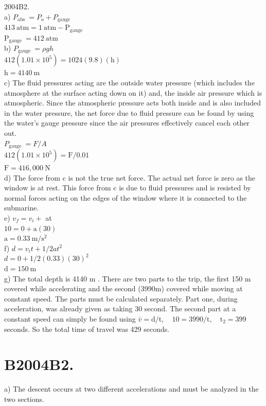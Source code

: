 \begin{enumerate}
2004B2.\\
a) $P_{\text {abs }}=P_{o}+P_{\text {gauge }}$\\
$413 \mathrm{~atm}=1 \mathrm{~atm}-\mathrm{P}_{\text {gauge }}$\\
$\mathrm{P}_{\text {gauge }}=412 \mathrm{~atm}$\\
b) $P_{\text {gauge }}=\rho g h$\\
$412\left(1.01 \times 10^{5}\right)=1024(9.8)(\mathrm{h})$\\
$\mathrm{h}=4140 \mathrm{~m}$\\
c) The fluid pressures acting are the outside water pressure (which includes the atmosphere at the surface acting down on it) and, the inside air pressure which is atmospheric. Since the atmospheric pressure acts both inside and is also included in the water pressure, the net force due to fluid pressure can be found by using the water's gauge pressure since the air pressures effectively cancel each other out.\\
$P_{\text {gauge }}=F / A$\\
$412\left(1.01 \times 10^{5}\right)=\mathrm{F} / 0.01$\\
$\mathrm{F}=416,000 \mathrm{~N}$\\
d) The force from c is not the true net force. The actual net force is zero as the window is at rest. This force from c is due to fluid pressures and is resisted by normal forces acting on the edges of the window where it is connected to the submarine.\\
e) $v_{f}=v_{i}+$ at\\
$10=0+\mathrm{a}(30)$\\
$\mathrm{a}=0.33 \mathrm{~m} / \mathrm{s}^{2}$\\
f) $d=v_{i} t+1 / 2 a t^{2}$\\
$d=0+1 / 2(0.33)(30)^{2}$\\
$\mathrm{d}=150 \mathrm{~m}$\\
g) The total depth is 4140 m . There are two parts to the trip, the first 150 m covered while accelerating and the second (3990m) covered while moving at constant speed. The parts must be calculated separately. Part one, during acceleration, was already given as taking 30 second. The second part at a constant speed can simply be found using $\bar{v}=\mathrm{d} / \mathrm{t}, \quad 10=3990 / \mathrm{t}, \quad \mathrm{t}_{2}=399$ seconds. So the total time of travel was 429 seconds.

\section*{B2004B2.}
a) The descent occurs at two different accelerations and must be analyzed in the two sections.


\end{enumerate}
